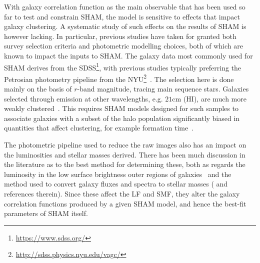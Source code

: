 \documentclass[usenatbib,useAMS]{mnras}
\newcommand{\HI}{\ensuremath{\mathrm{H}\scriptstyle\mathrm{I}}}
\begin{document}
With galaxy correlation function as the main observable that has been used so far to test and constrain \ac{SHAM}, the model is sensitive to effects that impact galaxy clustering. A systematic study of such effects on the results of \ac{SHAM} is however lacking. In particular, previous studies have taken for granted both survey selection criteria and photometric modelling choices, both of which are known to impact the inputs to \ac{SHAM}. The galaxy data most commonly used for \ac{SHAM} derives from the \ac{SDSS}\footnote{\url{https://www.sdss.org/}}, with previous studies typically preferring the Petrosian photometry pipeline from the \ac{NYU}\footnote{\url{http://sdss.physics.nyu.edu/vagc/}}~\citep{NYU}. The selection here is done mainly on the basis of $r$-band magnitude, tracing main sequence stars. Galaxies selected through emission at other wavelengths, e.g. $21\mathrm{cm}$ ($\HI$), are much more weakly clustered~\citep{Li,Martin,Papastergis_HIclust}. This requires \ac{SHAM} models designed for such samples to associate galaxies with a subset of the halo population significantly biased in quantities that affect clustering, for example formation time~\citep{Guo}.

The photometric pipeline used to reduce the raw images also has an impact on the luminosities and stellar masses derived. There has been much discussion in the literature as to the best method for determining these, both as regards the luminosity in the low surface brightness outer regions of galaxies~\citep{Blanton_subtraction, Bernardi, Kravtsov_SMF} and the method used to convert galaxy fluxes and spectra to stellar masses (\citealt{Baldry:2008ru} and references therein). Since these affect the \ac{LF} and \ac{SMF}, they alter the galaxy correlation functions produced by a given \ac{SHAM} model, and hence the best-fit parameters of \ac{SHAM} itself.
\end{document}
